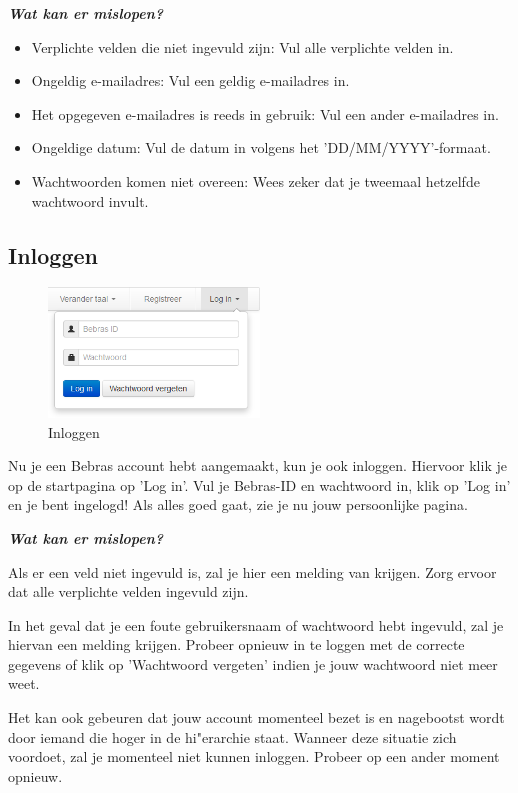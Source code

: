 \documentclass[]{article}
\begin{document}
\textbf{\textit{Wat kan er mislopen?}}

\begin{itemize}
\item Verplichte velden die niet ingevuld zijn: Vul alle verplichte velden in.
\item Ongeldig e-mailadres: Vul een geldig e-mailadres in.
\item Het opgegeven e-mailadres is reeds in gebruik: Vul een ander e-mailadres in.
\item Ongeldige datum: Vul de datum in volgens het 'DD/MM/YYYY'-formaat.
\item Wachtwoorden komen niet overeen: Wees zeker dat je tweemaal hetzelfde wachtwoord invult.
\end{itemize}

\subsection{Inloggen}

\begin{figure}[!ht]
	\centering
	\includegraphics[width=0.5\textwidth]{img/loginscreen}
	\caption{Inloggen}
	\label{loginscreen}
\end{figure}

Nu je een Bebras account hebt aangemaakt, kun je ook inloggen. Hiervoor klik je op de startpagina op 'Log in'. Vul je Bebras-ID en wachtwoord in, klik op 'Log in' en je bent ingelogd! Als alles goed gaat, zie je nu jouw persoonlijke pagina. 

\textbf{\textit{Wat kan er mislopen?}}

Als er een veld niet ingevuld is, zal je hier een melding van krijgen. Zorg ervoor dat alle verplichte velden ingevuld zijn.

In het geval dat je een foute gebruikersnaam of wachtwoord hebt ingevuld, zal je hiervan een melding krijgen. Probeer opnieuw in te loggen met de correcte gegevens of klik op 'Wachtwoord vergeten' indien je jouw wachtwoord niet meer weet.

Het kan ook gebeuren dat jouw account momenteel bezet is en nagebootst wordt door iemand die hoger in de hi"erarchie staat. Wanneer deze situatie zich voordoet, zal je momenteel niet kunnen inloggen. Probeer op een ander moment opnieuw.
\end{document}

